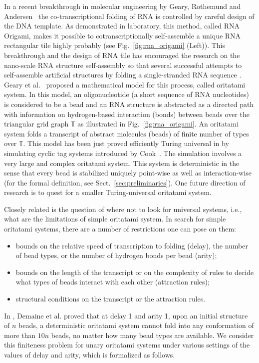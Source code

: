 \documentclass[runningheads]{llncs}
\begin{document}
In a recent breakthrough in molecular engineering by Geary, Rothemund and Andersen~\cite{GearyRothemundAndersen2014} the co-transcriptional folding of RNA is controlled by careful design of the DNA template. As demonstrated in laboratory, this method, called RNA Origami, makes it possible to cotranscriptionally self-assemble a unique RNA rectangular tile highly probably (see Fig.~\ref{fig:rna_origami} (Left)). 
This breakthrough and the design of RNA tile has encouraged the research on the nano-scale RNA structure self-assembly so that several successful attempts to self-assemble artificial structures by folding a single-stranded RNA sequence \cite{EKOMSSSO2018,YanYin2017}. 
Geary et al.~\cite{GeMeScSe2016} proposed a mathematical model for this process, called oritatami system. 
In this model, an oligonucleotide (a short sequence of RNA nucleotides) is considered to be a bead and an RNA structure is abstracted as a directed path with information on hydrogen-based interaction (bonds) between beads over the triangular grid graph $\mathbb{T}$ as illustrated in Fig.~\ref{fig:rna_origami}. 
An oritatami system folds a transcript of abstract molecules (beads) of finite number of types over $\mathbb{T}$. 
This model has been just proved efficiently Turing universal in \cite{GeMeScSe2018} by simulating cyclic tag systems introduced by Cook~\cite{Cook2004}. 
The simulation involves a very large and complex oritatami system. 
This system is deterministic in the sense that every bead is stabilized uniquely point-wise as well as interaction-wise (for the formal definition, see Sect.~\ref{sec:preliminaries}). 
One future direction of research is to quest for a smaller Turing-universal oritatami system.




Closely related is the question of where not to look for universal systems, i.e., what are the limitations of simple oritatami system. 
In search for simple oritatami systems, there are a number of restrictions one can pose on them:
\begin{itemize}
\item bounds on the relative speed of transcription to folding (delay), the number of bead types, or the number of hydrogen bonds per bead (arity);
\item bounds on the length of the transcript or on the complexity of rules to decide what types of beads interact with each other (attraction rules);
\item structural conditions on the transcript or the attraction rules.
\end{itemize}
%
In \cite{DHOPRSST2018}, Demaine et al. proved that at delay 1 and arity 1, upon an initial structure of $n$ beads, a deterministic oritatami system cannot fold into any conformation of more than $10n$ beads, no matter how many bead types are available. 
We consider this finiteness problem for unary oritatami systems under various settings of the values of delay and arity, which is formalized as follows. 
\end{document}
